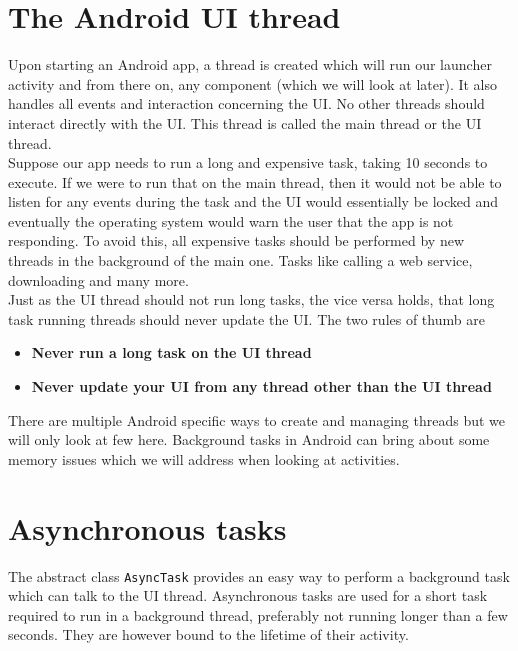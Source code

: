 \section{The Android UI thread}
Upon starting an Android app, a thread is created which will run our launcher activity and from there on, any component (which we will look at later). It also handles all events and interaction concerning the UI. No other threads should interact directly with the UI. This thread is called the main thread or the UI thread.\\

Suppose our app needs to run a long and expensive task, taking 10 seconds to execute. If we were to run that on the main thread, then it would not be able to listen for any events during the task and the UI would essentially be locked and eventually the operating system would warn the user that the app is not responding. To avoid this, all expensive tasks should be performed by new threads in the background of the main one. Tasks like calling a web service, downloading and many more.\\

Just as the UI thread should not run long tasks, the vice versa holds, that long task running threads should never update the UI. The two rules of thumb are
\begin{itemize}
\item \textbf{Never run a long task on the UI thread}
\item \textbf{Never update your UI from any thread other than the UI thread}
\end{itemize}

There are multiple Android specific ways to create and managing threads but we will only look at few here. Background tasks in Android can bring about some memory issues which we will address when looking at activities.

\section{Asynchronous tasks}
The abstract class \texttt{AsyncTask} provides an easy way to perform a background task which can talk to the UI thread. Asynchronous tasks are used for a short task required to run in a background thread, preferably not running longer than a few seconds. They are however bound to the lifetime of their activity.\\

